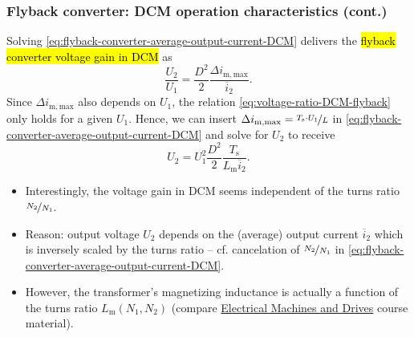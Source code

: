 \begin{frame}
    \frametitle{Flyback converter: DCM operation characteristics (cont.)}
    Solving \eqref{eq:flyback-converter-average-output-current-DCM} delivers the \hl{flyback converter voltage gain in DCM} as
    \begin{equation}
        \frac{U_2}{U_1} = \frac{D^2}{2} \frac{\Delta i_\mathrm{m,max}}{\overline{i}_2}.
        \label{eq:voltage-ratio-DCM-flyback}
    \end{equation}
    \pause%
    Since $\Delta i_\mathrm{m,max}$ also depends on $U_1$, the relation \eqref{eq:voltage-ratio-DCM-flyback} only holds for a given $U_1$. Hence, we can insert $\Delta i_\mathrm{m,max}=\nicefrac{T_\mathrm{s} \cdot U_1}{L}$ in \eqref{eq:flyback-converter-average-output-current-DCM} and solve for $U_2$ to receive
    \begin{equation}
        U_2= U_1^2 \frac{D^2}{2} \frac{T_\mathrm{s}}{L_\mathrm{m} \overline{i}_2}.
    \end{equation}
    \begin{itemize}
        \item<3-> Interestingly, the voltage gain in DCM seems independent of the turns ratio $\nicefrac{N_2}{N_1}$.
        \item<4-> Reason: output voltage $U_2$ depends on the (average) output current $\overline{i}_2$ which is inversely scaled by the turns ratio -- cf. cancelation of $\nicefrac{N_2}{N_1}$ in \eqref{eq:flyback-converter-average-output-current-DCM}.
        \item<5-> However, the transformer's magnetizing inductance is actually a function of the turns ratio $L_\mathrm{m}(N_1, N_2)$ (compare \href{https://github.com/IAS-Uni-Siegen/EMD_course}{Electrical Machines and Drives} course material). 
    \end{itemize}
\end{frame}

